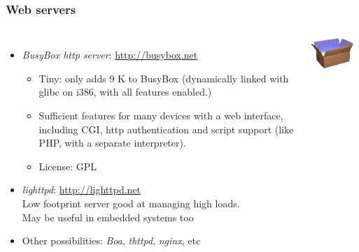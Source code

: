 \begin{frame}
  \frametitle{Web servers}
  \begin{columns}
    \begin{itemize}
    \item {\em BusyBox http server}: \url{http://busybox.net}
      \begin{itemize}
      \item Tiny: only adds 9 K to BusyBox (dynamically linked with
        glibc on i386, with all features enabled.)
      \item Sufficient features for many devices with a web interface,
        including CGI, http authentication and script support (like
        PHP, with a separate interpreter).
      \item License: GPL
      \end{itemize}
    \item {\em lighttpd}: \url{http://lighttpd.net}\\
      Low footprint server good at managing high loads.\\
      May be useful in embedded systems too
    \item Other possibilities: {\em Boa}, {\em thttpd}, {\em nginx},
      etc
    \end{itemize}
    \includegraphics[width=0.9\textwidth]{slides/sysdev-embedded-linux/busybox.png}\\

\end{columns}
\end{frame}
